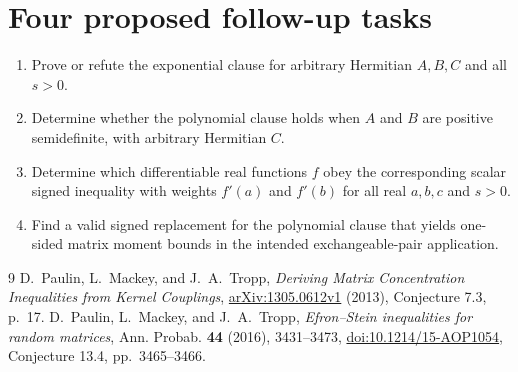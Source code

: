 \documentclass[11pt]{article}
\begin{document}
\section*{Four proposed follow-up tasks}
\begin{enumerate}
\item[Task 2.] Prove or refute the exponential clause for arbitrary
Hermitian $A,B,C$ and all $s>0$.
\item[Task 3.] Determine whether the polynomial clause holds when
$A$ and $B$ are positive semidefinite, with arbitrary Hermitian $C$.
\item[Task 4.] Determine which differentiable real functions $f$ obey
the corresponding scalar signed inequality with weights $f'(a)$ and
$f'(b)$ for all real $a,b,c$ and $s>0$.
\item[Task 5.] Find a valid signed replacement for the polynomial
clause that yields one-sided matrix moment bounds in the intended
exchangeable-pair application.
\end{enumerate}

\begin{thebibliography}{9}
 D.~Paulin, L.~Mackey, and J.~A.~Tropp,
\emph{Deriving Matrix Concentration Inequalities from Kernel Couplings},
\href{https://arxiv.org/abs/1305.0612v1}{arXiv:1305.0612v1} (2013),
Conjecture 7.3, p.~17.
 D.~Paulin, L.~Mackey, and J.~A.~Tropp,
\emph{Efron--Stein inequalities for random matrices},
Ann. Probab. \textbf{44} (2016), 3431--3473,
\href{https://doi.org/10.1214/15-AOP1054}{doi:10.1214/15-AOP1054},
Conjecture 13.4, pp.~3465--3466.
\end{thebibliography}
\end{document}
